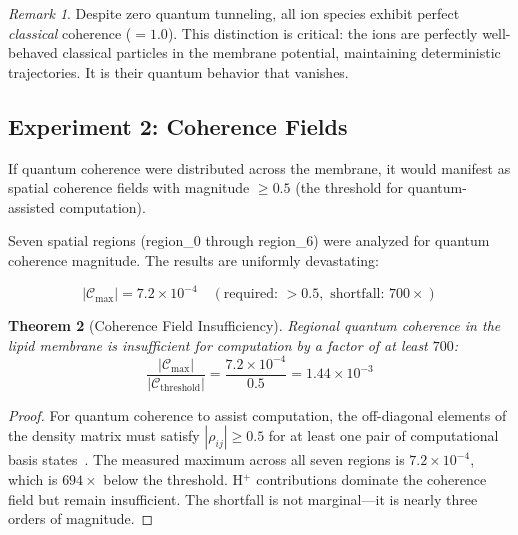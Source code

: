 \documentclass[12pt]{article}
\newtheorem{theorem}{Theorem}[section]
\theoremstyle{definition}
\theoremstyle{remark}
\newtheorem{remark}[theorem]{Remark}
\begin{document}
\begin{remark}
\label{rem:classical_coherence}
Despite zero quantum tunneling, all ion species exhibit perfect \emph{classical} coherence ($= 1.0$). This distinction is critical: the ions are perfectly well-behaved classical particles in the membrane potential, maintaining deterministic trajectories. It is their quantum behavior that vanishes.
\end{remark}

\subsection{Experiment 2: Coherence Fields}

If quantum coherence were distributed across the membrane, it would manifest as spatial coherence fields with magnitude $\geq 0.5$ (the threshold for quantum-assisted computation).

Seven spatial regions (region\_0 through region\_6) were analyzed for quantum coherence magnitude. The results are uniformly devastating:

\begin{equation}
\label{eq:coherence_field}
|\mathcal{C}_{\mathrm{max}}| = 7.2 \times 10^{-4} \quad (\text{required: } > 0.5, \text{ shortfall: } 700\times)
\end{equation}

\begin{theorem}[Coherence Field Insufficiency]
\label{thm:coherence}
Regional quantum coherence in the lipid membrane is insufficient for computation by a factor of at least $700$:
\begin{equation}
\label{eq:coherence_ratio}
\frac{|\mathcal{C}_{\mathrm{max}}|}{|\mathcal{C}_{\mathrm{threshold}}|} = \frac{7.2 \times 10^{-4}}{0.5} = 1.44 \times 10^{-3}
\end{equation}
\end{theorem}

\begin{proof}
For quantum coherence to assist computation, the off-diagonal elements of the density matrix must satisfy $|\rho_{ij}| \geq 0.5$ for at least one pair of computational basis states~\citep{lambert2013quantum}. The measured maximum across all seven regions is $7.2 \times 10^{-4}$, which is $694\times$ below the threshold. H$^+$ contributions dominate the coherence field but remain insufficient. The shortfall is not marginal---it is nearly three orders of magnitude. \qedhere
\end{proof}
\end{document}
